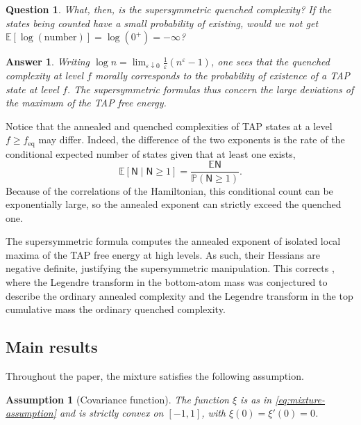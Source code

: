 \documentclass[a4paper,10pt,reqno]{amsart}
\numberwithin{equation}{section}
\newtheorem*{question}{Question}%
\newtheorem*{answer}{Answer}%
\newtheorem{assumption}[remark]{Assumption}
\newcommand{\ve}{\varepsilon}
\newcommand{\dP}{\mathbb{P}}%
\newcommand{\dE}{\mathbb{E}}%
\newcommand{\eq}{\mathrm{eq}}
\begin{document}
	\begin{question}
		What, then, is the supersymmetric quenched complexity? If the states being
		counted have a small probability of existing, would we not get
		$\dE[\log(\mathrm{number})]=\log(0^+)=-\infty$?
	\end{question}
	
	\begin{answer}
		Writing $\log n=\lim_{\ve\downarrow0}\tfrac1\ve(n^\ve-1)$, one sees that the quenched complexity at level $f$ morally corresponds to the probability of existence of a TAP state at level $f$. The supersymmetric formulas thus concern the large deviations of
		the maximum of the TAP free energy.
	\end{answer}
	
	Notice that the annealed and quenched complexities of TAP states at a level
	$f\ge f_{\eq}$ may differ. Indeed, the difference of the two exponents is the rate
	of the conditional expected number of states given that at least one exists,
	\[
	\dE[\mathsf N\mid\mathsf N\ge1]
	=\frac{\dE\mathsf N}{\dP(\mathsf N\ge1)}.
	\]
	Because of the correlations of the Hamiltonian, this conditional count can be exponentially large, so the annealed exponent can strictly exceed the quenched one. 
	
	The supersymmetric formula computes the annealed exponent of isolated local
	maxima of the TAP free energy at high levels. As such, their Hessians are
	negative definite, justifying the supersymmetric manipulation.
	This corrects \cite[Conjectures~1 and~2]{TAPIsing}, where the Legendre
	transform in the bottom-atom mass was conjectured to describe the ordinary
	annealed complexity and the Legendre transform in the top cumulative mass
	the ordinary quenched complexity.
	
	\subsection{Main results}\label{sub:main-results}
	
	Throughout the paper, the mixture satisfies the following
	assumption.
	
	\begin{assumption}[Covariance function]\label{ass:xi}
		The function \(\xi\) is as in \eqref{eq:mixture-assumption} and is
		strictly convex on \([-1,1]\), with \(\xi(0)=\xi'(0)=0\).
	\end{assumption}
	
\end{document}
